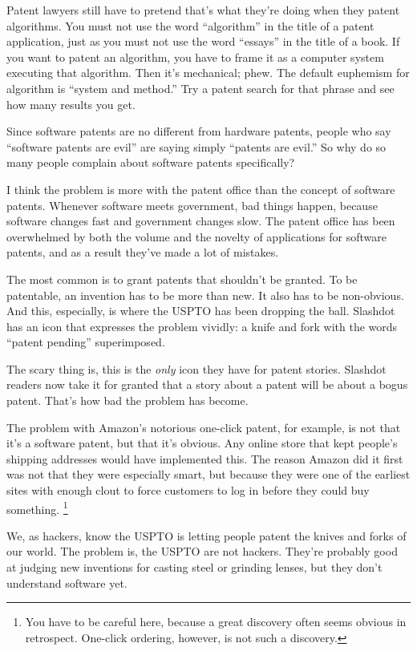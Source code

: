 \documentclass[12pt]{book}
\begin{document}
Patent lawyers still have to pretend that's what they're doing when they
patent algorithms. You must not use the word ``algorithm'' in the title
of a patent application, just as you must not use the word ``essays'' in
the title of a book. If you want to patent an algorithm, you have to
frame it as a computer system executing that algorithm. Then it's
mechanical; phew. The default euphemism for algorithm is ``system and
method.'' Try a patent search for that phrase and see how many results
you get.

Since software patents are no different from hardware patents, people
who say ``software patents are evil'' are saying simply ``patents are
evil.'' So why do so many people complain about software patents
specifically?

I think the problem is more with the patent office than the concept of
software patents. Whenever software meets government, bad things happen,
because software changes fast and government changes slow. The patent
office has been overwhelmed by both the volume and the novelty of
applications for software patents, and as a result they've made a lot of
mistakes.

The most common is to grant patents that shouldn't be granted. To be
patentable, an invention has to be more than new. It also has to be
non-obvious. And this, especially, is where the USPTO has been dropping
the ball. Slashdot has an icon that expresses the problem vividly: a
knife and fork with the words ``patent pending'' superimposed.

The scary thing is, this is the \emph{only} icon they have for patent
stories. Slashdot readers now take it for granted that a story about a
patent will be about a bogus patent. That's how bad the problem has
become.

The problem with Amazon's notorious one-click patent, for example, is
not that it's a software patent, but that it's obvious. Any online store
that kept people's shipping addresses would have implemented this. The
reason Amazon did it first was not that they were especially smart, but
because they were one of the earliest sites with enough clout to force
customers to log in before they could buy something.
\footnote{You have to be careful here, because a great discovery often
seems obvious in retrospect. One-click ordering, however, is not such a
discovery.}

We, as hackers, know the USPTO is letting people patent the knives and
forks of our world. The problem is, the USPTO are not hackers. They're
probably good at judging new inventions for casting steel or grinding
lenses, but they don't understand software yet.
\end{document}
